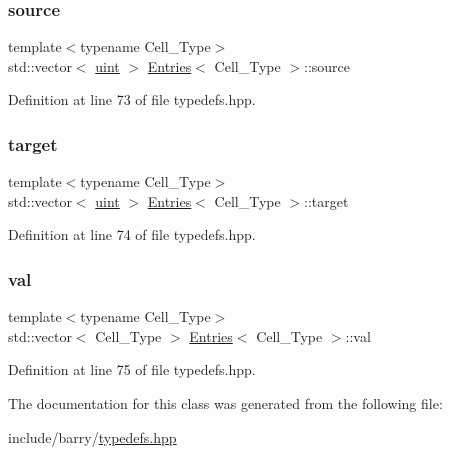 \subsubsection{\texorpdfstring{source}{source}}
{\footnotesize\ttfamily template$<$typename Cell\+\_\+\+Type$>$ \\
std\+::vector$<$ \hyperlink{typedefs_8hpp_a91ad9478d81a7aaf2593e8d9c3d06a14}{uint} $>$ \hyperlink{class_entries}{Entries}$<$ Cell\+\_\+\+Type $>$\+::source}



Definition at line 73 of file typedefs.\+hpp.

\mbox{\label{class_entries_a02dad3917fa68044b9ea9c60b2909fd7}} 
\subsubsection{\texorpdfstring{target}{target}}
{\footnotesize\ttfamily template$<$typename Cell\+\_\+\+Type$>$ \\
std\+::vector$<$ \hyperlink{typedefs_8hpp_a91ad9478d81a7aaf2593e8d9c3d06a14}{uint} $>$ \hyperlink{class_entries}{Entries}$<$ Cell\+\_\+\+Type $>$\+::target}



Definition at line 74 of file typedefs.\+hpp.

\mbox{\label{class_entries_ae0726e20b17868665cdae6ff70f93bb4}} 
\subsubsection{\texorpdfstring{val}{val}}
{\footnotesize\ttfamily template$<$typename Cell\+\_\+\+Type$>$ \\
std\+::vector$<$ Cell\+\_\+\+Type $>$ \hyperlink{class_entries}{Entries}$<$ Cell\+\_\+\+Type $>$\+::val}



Definition at line 75 of file typedefs.\+hpp.



The documentation for this class was generated from the following file\+:\begin{DoxyCompactItemize}
\item 
include/barry/\hyperlink{typedefs_8hpp}{typedefs.\+hpp}\end{DoxyCompactItemize}
